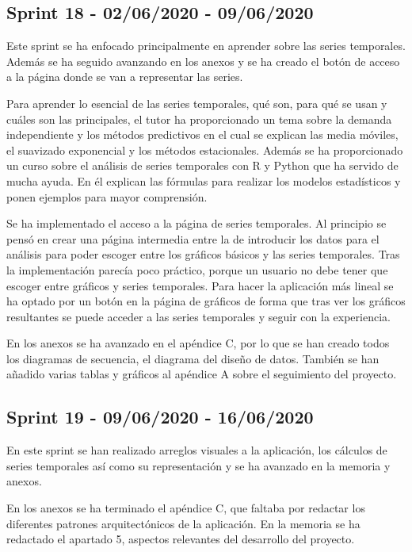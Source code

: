 \subsection{Sprint 18 - 02/06/2020 - 09/06/2020}
Este sprint se ha enfocado principalmente en aprender sobre las series temporales. Además se ha seguido avanzando en los anexos y se ha creado el botón de acceso a la página donde se van a representar las series.

Para aprender lo esencial de las series temporales, qué son, para qué se usan y cuáles son las principales, el tutor ha proporcionado un tema sobre la demanda independiente y los métodos predictivos en el cual se explican las media móviles, el suavizado exponencial y los métodos estacionales.
Además se ha proporcionado un curso sobre el análisis de series temporales con R y Python que ha servido de mucha ayuda. En él explican las fórmulas para realizar los modelos estadísticos y ponen ejemplos para mayor comprensión.

Se ha implementado el acceso a la página de series temporales. Al principio se pensó en crear una página intermedia entre la de introducir los datos para el análisis para poder escoger entre los gráficos básicos y las series temporales. Tras la implementación parecía poco práctico, porque un usuario no debe tener que escoger entre gráficos y series temporales. Para hacer la aplicación más lineal se ha optado por un botón en la página de gráficos de forma que tras ver los gráficos resultantes se puede acceder a las series temporales y seguir con la experiencia.

En los anexos se ha avanzado en el apéndice C, por lo que se han creado todos los diagramas de secuencia, el diagrama del diseño de datos. También se han añadido varias tablas y gráficos al apéndice A sobre el seguimiento del proyecto.


\subsection{Sprint 19 - 09/06/2020 - 16/06/2020}
En este sprint se han realizado arreglos visuales a la aplicación, los cálculos de series temporales así como su representación y se ha avanzado en la memoria y anexos.

En los anexos se ha terminado el apéndice C, que faltaba por redactar los diferentes patrones arquitectónicos de la aplicación. En la memoria se ha redactado el apartado 5, aspectos relevantes del desarrollo del proyecto.

